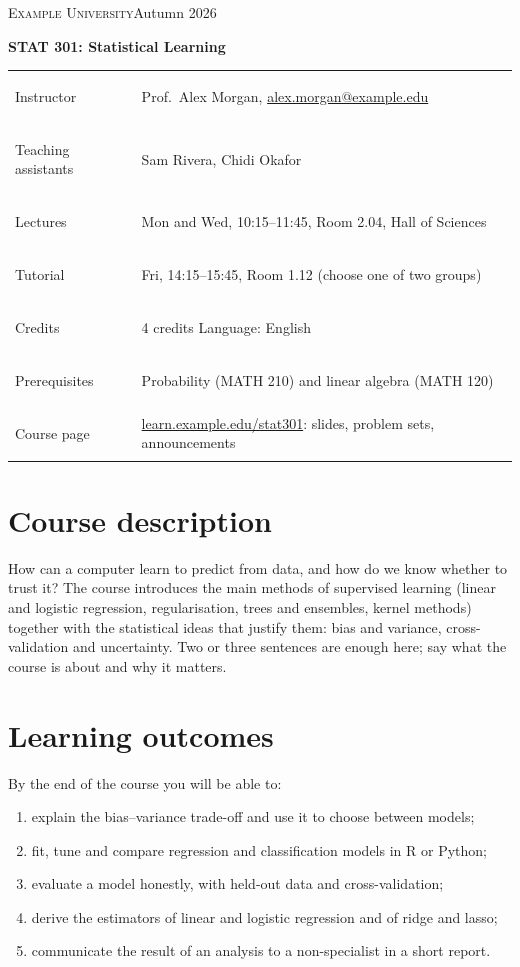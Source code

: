 \documentclass[11pt,a4paper]{article}
\begin{document}
{\Large\color{accent}\textsc{Example University}\hfill Autumn 2026}\par
{\Huge\bfseries STAT 301: Statistical Learning}\par
\smallskip

\begin{tabularx}{\textwidth}{@{}>{\bfseries\raggedright\arraybackslash}p{3.9cm}L@{}}
  \toprule
  Instructor      & Prof.\ Alex Morgan, \href{mailto:alex.morgan@example.edu}{alex.morgan@example.edu} \\
  Teaching assistants & Sam Rivera, Chidi Okafor \\
  Lectures        & Mon and Wed, 10:15--11:45, Room 2.04, Hall of Sciences \\
  Tutorial        & Fri, 14:15--15:45, Room 1.12 (choose one of two groups) \\
  Credits         & 4 credits \qquad Language: English \\
  Prerequisites   & Probability (MATH 210) and linear algebra (MATH 120) \\
  Course page     & \href{https://learn.example.edu/stat301}{learn.example.edu/stat301}: slides, problem sets, announcements \\
  \bottomrule
\end{tabularx}

\section{Course description}
How can a computer learn to predict from data, and how do we know whether to trust it?
The course introduces the main methods of supervised learning (linear and logistic
regression, regularisation, trees and ensembles, kernel methods) together with the
statistical ideas that justify them: bias and variance, cross-validation and uncertainty.
Two or three sentences are enough here; say what the course is about and why it matters.

\section{Learning outcomes}
By the end of the course you will be able to:
\begin{enumerate}
  \item explain the bias--variance trade-off and use it to choose between models;
  \item fit, tune and compare regression and classification models in R or Python;
  \item evaluate a model honestly, with held-out data and cross-validation;
  \item derive the estimators of linear and logistic regression and of ridge and lasso;
  \item communicate the result of an analysis to a non-specialist in a short report.
\end{enumerate}
\end{document}
